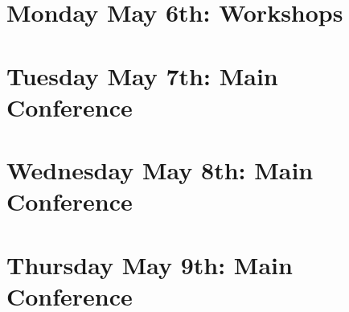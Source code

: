\documentclass[11pt]{article}
\begin{document}
\newpage
\section{Monday May 6th: Workshops}




\newpage
\section{Tuesday May 7th: Main Conference}




\newpage
\section{Wednesday May 8th: Main Conference}




\newpage
\section{Thursday May 9th: Main Conference}






\newpage


\end{document}
